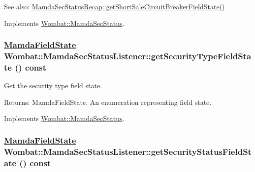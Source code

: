 \begin{Desc}
\item[See also:]\hyperlink{classWombat_1_1MamdaSecStatusRecap_ab1dabb0f90d5d2bccb7e6a5c2a80f98}{Mamda\-Sec\-Status\-Recap::get\-Short\-Sale\-Circuit\-Breaker\-Field\-State()} \end{Desc}


Implements \hyperlink{classWombat_1_1MamdaSecStatus_6bd9783d55cd92b9c4d7c7a2db736e27}{Wombat::Mamda\-Sec\-Status}.\hypertarget{classWombat_1_1MamdaSecStatusListener_61d631913cca79d7919a225c9d42e5d1}{
\subsubsection[getSecurityTypeFieldState]{\setlength{\rightskip}{0pt plus 5cm}\hyperlink{namespaceWombat_93aac974f2ab713554fd12a1fa3b7d2a}{Mamda\-Field\-State} Wombat::Mamda\-Sec\-Status\-Listener::get\-Security\-Type\-Field\-State () const}}
\label{classWombat_1_1MamdaSecStatusListener_61d631913cca79d7919a225c9d42e5d1}


Get the security type field state. 

\begin{Desc}
\item[Returns:]Mamda\-Field\-State. An enumeration representing field state. \end{Desc}


Implements \hyperlink{classWombat_1_1MamdaSecStatus_ab32e4e57845c7982605e64abadbcaf0}{Wombat::Mamda\-Sec\-Status}.\hypertarget{classWombat_1_1MamdaSecStatusListener_f5a0928dfb229b6c39fd64c07628d37a}{
\subsubsection[getSecurityStatusFieldState]{\setlength{\rightskip}{0pt plus 5cm}\hyperlink{namespaceWombat_93aac974f2ab713554fd12a1fa3b7d2a}{Mamda\-Field\-State} Wombat::Mamda\-Sec\-Status\-Listener::get\-Security\-Status\-Field\-State () const}}
\label{classWombat_1_1MamdaSecStatusListener_f5a0928dfb229b6c39fd64c07628d37a}


